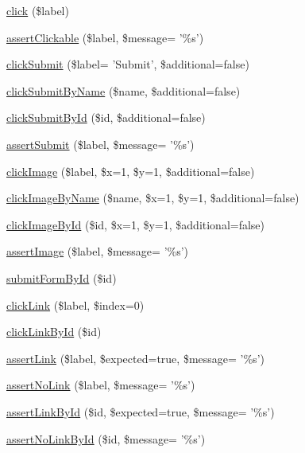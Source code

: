 \begin{DoxyCompactItemize}
\hyperlink{class_web_test_case_a55d9b7671e27cb63d19107722628bd8e}{click} (\$label)
\item 
\hyperlink{class_web_test_case_ac2a2523df882dcad5f6191b9d6386d4a}{assertClickable} (\$label, \$message= '\%s')
\item 
\hyperlink{class_web_test_case_a7c7a1adc6ce99397bda5914edca76eaf}{clickSubmit} (\$label= 'Submit', \$additional=false)
\item 
\hyperlink{class_web_test_case_ad23d94f7be9a92d07c36772b302cd495}{clickSubmitByName} (\$name, \$additional=false)
\item 
\hyperlink{class_web_test_case_a8de6c0c32b24d21b3d077487acbf4237}{clickSubmitById} (\$id, \$additional=false)
\item 
\hyperlink{class_web_test_case_a56874c6913a45fe55a581128a1e956e4}{assertSubmit} (\$label, \$message= '\%s')
\item 
\hyperlink{class_web_test_case_a235d36a855726467258fd896f724f1c9}{clickImage} (\$label, \$x=1, \$y=1, \$additional=false)
\item 
\hyperlink{class_web_test_case_a5b555b4f2c9013abcf3b3893a3447607}{clickImageByName} (\$name, \$x=1, \$y=1, \$additional=false)
\item 
\hyperlink{class_web_test_case_aa470415b0fc11df87ce6e5d2ea5a5644}{clickImageById} (\$id, \$x=1, \$y=1, \$additional=false)
\item 
\hyperlink{class_web_test_case_a657a5b3135189f9e9db563a76dce9329}{assertImage} (\$label, \$message= '\%s')
\item 
\hyperlink{class_web_test_case_addbc36aa63cbd70458383bc2fae78c03}{submitFormById} (\$id)
\item 
\hyperlink{class_web_test_case_a286ade62f142d1ac0b5d0bc9038a01cf}{clickLink} (\$label, \$index=0)
\item 
\hyperlink{class_web_test_case_ac87eaa5a61ab4ba0fe12deab4ddc97e2}{clickLinkById} (\$id)
\item 
\hyperlink{class_web_test_case_ae44bbb204f6496039507a06361f05431}{assertLink} (\$label, \$expected=true, \$message= '\%s')
\item 
\hyperlink{class_web_test_case_a317931c404b513787a96c801f852d01f}{assertNoLink} (\$label, \$message= '\%s')
\item 
\hyperlink{class_web_test_case_ab2edabae7160d6b9646de3c366b7c640}{assertLinkById} (\$id, \$expected=true, \$message= '\%s')
\item 
\hyperlink{class_web_test_case_abd3882e405ceda10d1a4c0063e4bd07a}{assertNoLinkById} (\$id, \$message= '\%s')

\end{DoxyCompactItemize}
